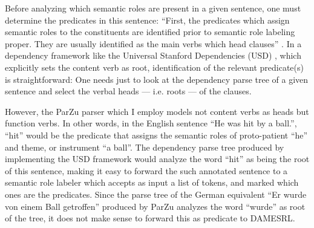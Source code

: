 Before analyzing which semantic roles are present in a given sentence, one
must determine the predicates in this sentence: ``First, the predicates which
assign semantic roles to the constituents are identified prior to semantic
role labeling proper. They are usually identified as the main verbs which
head clauses'' \citep[p.~74]{samardzic2013dynamics}. In a dependency framework
like the Universal Stanford Dependencies (USD) \citep{de2014universal},
which explicitly sets the content verb as root, identification of the
relevant predicate(s) is straightforward: One needs just to look at the dependency
parse tree of a given sentence and select the verbal heads --- i.e. roots ---
of the clauses.

However, the ParZu parser \citep{sennrich2009new} which I employ models not content verbs
as heads but function verbs. In other words, in the English
sentence ``He was hit by a ball.'', ``hit'' would be the predicate that assigns the semantic
roles of proto-patient ``he'' and theme, or instrument ``a ball''. The dependency parse tree
produced by implementing the USD framework would analyze the word ``hit'' as being the root
of this sentence, making it easy to forward the such annotated sentence to a semantic role
labeler which accepts as input a list of tokens, and marked which ones are the predicates.
Since the parse tree of the German equivalent ``Er wurde von einem Ball getroffen'' produced
by ParZu analyzes the word ``wurde'' as root of the tree, it does not make sense to forward
this as predicate to DAMESRL.



